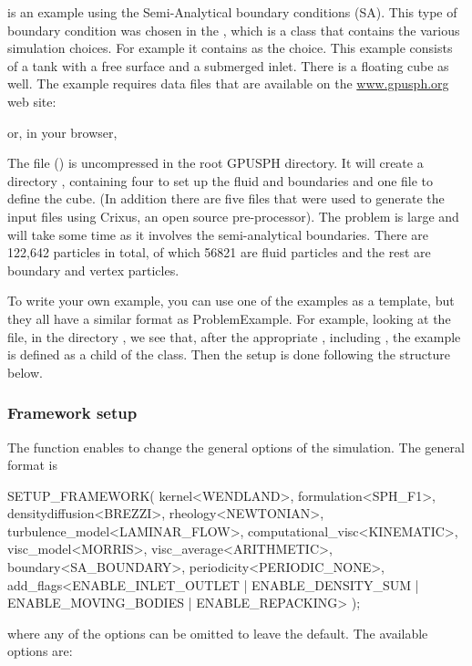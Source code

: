 \documentclass{../GPUSPHtemplate}
\begin{document}
 is an example using the Semi-Analytical boundary conditions (SA). 
This type of boundary condition was chosen in the  , 
which is a class that contains the various simulation choices. 
For example it contains  as the choice.   
This example consists of a tank with a free surface and a submerged inlet.  
There is a floating cube as well.  
The example requires data files that are available on the \url{www.gpusph.org} web site:

or, in your browser,

The file () is uncompressed 
in the root GPUSPH directory.  
It will create a directory , containing four  
to set up the fluid and boundaries and one  file to define the cube.  
(In addition there are five files that were used to generate the input files 
using Crixus, an open source pre-processor).  
The problem is large and will take some time as it involves the semi-analytical boundaries.  
There are 122,642 particles in total, of which 56821 are fluid particles 
and the rest are boundary and vertex particles.

To write your own example, you can use one of the examples as a template, 
but they all have a similar format as ProblemExample.  
For example, looking at the file,  in the directory 
, we see that, after the appropriate , 
including , the example is defined as a 
child of the  class.  
Then the setup is done following the structure below.

\subsubsection{Framework setup}

The  function enables to change the
 general options of the simulation. The general format is
\begin{ccode}
  SETUP_FRAMEWORK(
    kernel<WENDLAND>,
    formulation<SPH_F1>,
    densitydiffusion<BREZZI>,
    rheology<NEWTONIAN>,
    turbulence_model<LAMINAR_FLOW>,
    computational_visc<KINEMATIC>,
    visc_model<MORRIS>,
    visc_average<ARITHMETIC>,
    boundary<SA_BOUNDARY>,
    periodicity<PERIODIC_NONE>,
    add_flags<ENABLE_INLET_OUTLET | ENABLE_DENSITY_SUM 
        | ENABLE_MOVING_BODIES | ENABLE_REPACKING>
  );
\end{ccode}
where any of the options can be omitted to leave the default. The available options are:
\end{document}
